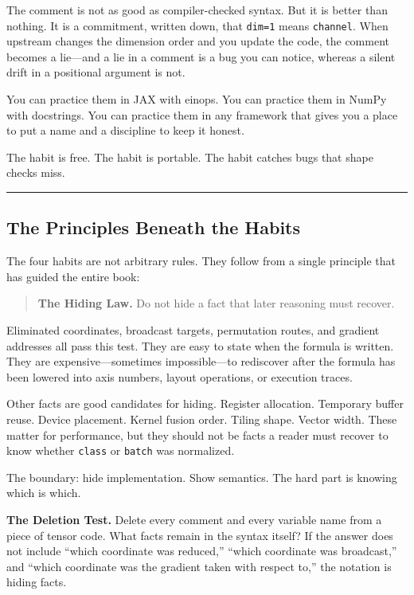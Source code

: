 \documentclass[11pt,]{article}
\begin{document}
The comment is not as good as compiler-checked syntax. But it is better
than nothing. It is a commitment, written down, that \texttt{dim=1}
means \texttt{channel}. When upstream changes the dimension order and
you update the code, the comment becomes a lie---and a lie in a comment
is a bug you can notice, whereas a silent drift in a positional argument
is not.

You can practice them in JAX with einops. You can practice them in NumPy
with docstrings. You can practice them in any framework that gives you a
place to put a name and a discipline to keep it honest.

The habit is free. The habit is portable. The habit catches bugs that
shape checks miss.

\begin{center}\rule{0.5\linewidth}{0.4pt}\end{center}

\hypertarget{the-principles-beneath-the-habits}{%
\subsection{The Principles Beneath the
Habits}\label{the-principles-beneath-the-habits}}

The four habits are not arbitrary rules. They follow from a single
principle that has guided the entire book:

\begin{quote}
\textbf{The Hiding Law.} Do not hide a fact that later reasoning must
recover.
\end{quote}

Eliminated coordinates, broadcast targets, permutation routes, and
gradient addresses all pass this test. They are easy to state when the
formula is written. They are expensive---sometimes impossible---to
rediscover after the formula has been lowered into axis numbers, layout
operations, or execution traces.

Other facts are good candidates for hiding. Register allocation.
Temporary buffer reuse. Device placement. Kernel fusion order. Tiling
shape. Vector width. These matter for performance, but they should not
be facts a reader must recover to know whether \texttt{class} or
\texttt{batch} was normalized.

The boundary: hide implementation. Show semantics. The hard part is
knowing which is which.

\textbf{The Deletion Test.} Delete every comment and every variable name
from a piece of tensor code. What facts remain in the syntax itself? If
the answer does not include ``which coordinate was reduced,'' ``which
coordinate was broadcast,'' and ``which coordinate was the gradient
taken with respect to,'' the notation is hiding facts.
\end{document}
